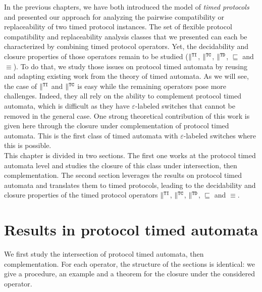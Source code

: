 
In the previous chapters, we have both introduced the model of \emph{timed protocols} and presented our approach for analyzing the pairwise compatibility or replaceability of two timed protocol instances. The set of flexible protocol compatibility and replaceability analysis classes that we presented can each be characterized by combining timed protocol operators. Yet, the decidability and closure properties of those operators remain to be studied ($\parallel^{\mathtt{TI}}$, $\parallel^{\mathtt{TC}}$, $\parallel^{\mathtt{TD}}$, $\sqsubseteq$ and $\equiv$). To do that, we study those issues on protocol timed automata by reusing and adapting existing work from the theory of timed automata. As we will see, the case of $\parallel^{\mathtt{TI}}$ and $\parallel^{\mathtt{TC}}$ is easy while the remaining operators pose more challenges. Indeed, they all rely on the ability to complement protocol timed automata, which is difficult as they have $\varepsilon$-labeled switches that cannot be removed in the general case. One strong theoretical contribution of this work is given here through the closure under complementation of protocol timed automata. This is the first class of timed automata with $\varepsilon$-labeled switches where this is possible.\\

This chapter is divided in two sections. The first one works at the protocol timed automata level and studies the closure of this class under intersection, then complementation. The second section leverages the results on protocol timed automata and translates them to timed protocols, leading to the decidability and closure properties of the timed protocol operators $\parallel^{\mathtt{TI}}$, $\parallel^{\mathtt{TC}}$, $\parallel^{\mathtt{TD}}$, $\sqsubseteq$ and $\equiv$.


\section{Results in protocol timed automata}


We first study the intersection of protocol timed automata, then complementation. For each operator, the structure of the sections is identical: we give a procedure, an example and a theorem for the closure under the considered operator.


